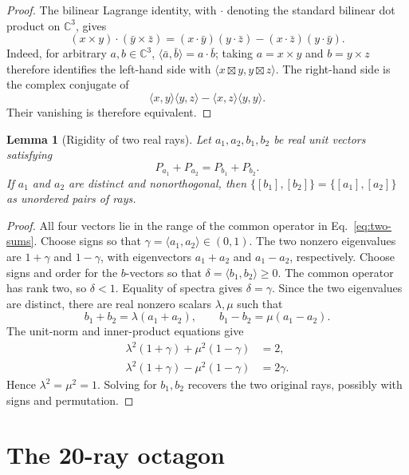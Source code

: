 \documentclass[twocolumn,aps,pra,floatfix,amsmath,amssymb,longbibliography]{revtex4-2}
\newtheorem{lemma}[theorem]{Lemma}
\theoremstyle{definition}
\theoremstyle{remark}
\newcommand{\C}{\mathbb C}
\begin{document}
\begin{proof}
The bilinear Lagrange identity, with $\mathbin{\cdot}$ denoting the standard
bilinear dot product on $\C^3$, gives
\[
 (x\times y)\mathbin{\cdot}(\bar y\times\bar z)
 =(x\mathbin{\cdot}\bar y)(y\mathbin{\cdot}\bar z)
 -(x\mathbin{\cdot}\bar z)(y\mathbin{\cdot}\bar y).
\]
Indeed, for arbitrary $a,b\in\C^3$,
$\langle\bar a,\bar b\rangle=a\mathbin{\cdot}\bar b$; taking
$a=x\times y$ and $b=y\times z$ therefore identifies the left-hand side
with $\langle x\boxtimes y,y\boxtimes z\rangle$.  The right-hand side
is the complex conjugate of
\[
 \langle x,y\rangle\langle y,z\rangle
 -\langle x,z\rangle\langle y,y\rangle.
\]
Their vanishing is therefore equivalent.
\end{proof}

\begin{lemma}[Rigidity of two real rays]
\label{lem:real-rigidity}
Let $a_1,a_2,b_1,b_2$ be real unit vectors satisfying
\begin{equation}
 P_{a_1}+P_{a_2}=P_{b_1}+P_{b_2}.
 \label{eq:two-sums}
\end{equation}
If $a_1$ and $a_2$ are distinct and nonorthogonal, then
$\{[b_1],[b_2]\}=\{[a_1],[a_2]\}$ as unordered pairs of rays.
\end{lemma}

\begin{proof}
All four vectors lie in the range of the common operator in
Eq.~\eqref{eq:two-sums}.  Choose signs so that
$\gamma=\langle a_1,a_2\rangle\in(0,1)$.  The two nonzero eigenvalues
are $1+\gamma$ and $1-\gamma$, with eigenvectors $a_1+a_2$ and
$a_1-a_2$, respectively.  Choose signs and order for the $b$-vectors so
that $\delta=\langle b_1,b_2\rangle\ge0$.  The common operator has rank two,
so $\delta<1$.  Equality of spectra gives
$\delta=\gamma$.  Since the two eigenvalues are distinct, there are real
nonzero scalars $\lambda,\mu$ such that
\[
 b_1+b_2=\lambda(a_1+a_2),\qquad
 b_1-b_2=\mu(a_1-a_2).
\]
The unit-norm and inner-product equations give
\begin{align*}
 \lambda^2(1+\gamma)+\mu^2(1-\gamma)&=2,\\
 \lambda^2(1+\gamma)-\mu^2(1-\gamma)&=2\gamma.
\end{align*}
Hence $\lambda^2=\mu^2=1$.  Solving for $b_1,b_2$ recovers the two
original rays, possibly with signs and permutation.
\end{proof}

\section{The 20-ray octagon}
\label{sec:h20}
\end{document}
